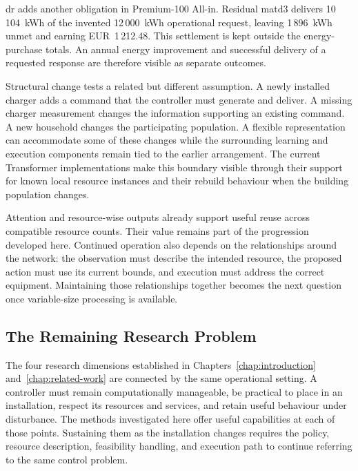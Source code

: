 

\illustrativereading \gls{dr} adds another obligation in Premium-100 All-in. Residual \gls{matd3} delivers 10\,104~kWh of the invented 12\,000~kWh operational request, leaving 1\,896~kWh unmet and earning EUR~1\,212.48. This settlement is kept outside the energy-purchase totals. An annual energy improvement and successful delivery of a requested response are therefore visible as separate outcomes.

Structural change tests a related but different assumption. A newly installed charger adds a command that the controller must generate and deliver. A missing charger measurement changes the information supporting an existing command. A new household changes the participating population. A flexible representation can accommodate some of these changes while the surrounding learning and execution components remain tied to the earlier arrangement. The current Transformer implementations make this boundary visible through their support for known local resource instances and their rebuild behaviour when the building population changes.

Attention and resource-wise outputs already support useful reuse across compatible resource counts. Their value remains part of the progression developed here. Continued operation also depends on the relationships around the network: the observation must describe the intended resource, the proposed action must use its current bounds, and execution must address the correct equipment. Maintaining those relationships together becomes the next question once variable-size processing is available.

\subsection{The Remaining Research Problem}

The four research dimensions established in Chapters~\ref{chap:introduction} and~\ref{chap:related-work} are connected by the same operational setting. A controller must remain computationally manageable, be practical to place in an installation, respect its resources and services, and retain useful behaviour under disturbance. The methods investigated here offer useful capabilities at each of those points. Sustaining them as the installation changes requires the policy, resource description, feasibility handling, and execution path to continue referring to the same control problem.

